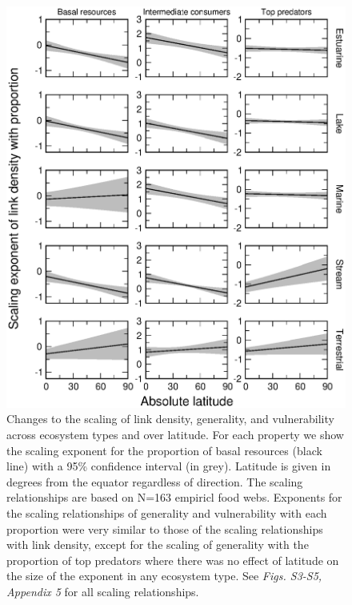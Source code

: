 \documentclass[12pt]{article}
\begin{document}
\begin{figure}[!H]
\centerline{\includegraphics*[height=.65\textheight]{Figures/by_TL/marginal/BIT_marginal_latitude.eps}}
\caption{Changes to the scaling of link density, generality, and vulnerability across ecosystem
types and over latitude. For each property we show the scaling exponent for the proportion of
basal resources (black line) with a 95\% confidence interval (in grey). Latitude is given in degrees
from the equator regardless of direction. The scaling relationships are based on N=163 empiricl food webs.
Exponents for the scaling relationships of generality and vulnerability with each proportion were very
similar to those of the scaling relationships with link density, except for the scaling of generality
with the proportion of top predators where there was no effect of latitude on the size of the exponent
in any ecosystem type. See \emph{Figs. S3-S5, Appendix 5} for all scaling relationships.}
\label{BIT}
\end{figure}
\end{document}
